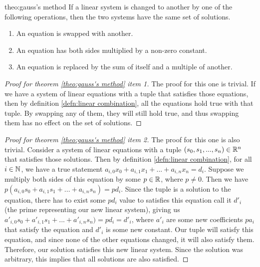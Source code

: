 \begin{theo}{theo:gauss's method}
	If a linear system is changed to another by one of the following operations, then the two systems have the same set of solutions.
	\begin{enumerate}
		\item An equation is swapped with another.
		\item An equation has both sides multiplied by a non-zero constant.
		\item An equation is replaced by the sum of itself and a multiple of another.
	\end{enumerate}
\end{theo}
\begin{proof}[Proof for theorem \ref{theo:gauss's method} item 1]
	The proof for this one is trivial. If we have a system of linear equations with a tuple that satisfies those equations, then by definition \ref{defn:linear combination}, all the equations hold true with that tuple. By swapping any of them, they will still hold true, and thus swapping them has no effect on the set of solutions.
\end{proof}
\begin{proof}[Proof for theorem \ref{theo:gauss's method} item 2]
	The proof for this one is also trivial. Consider a system of linear equations with a tuple $(s_0, s_1,..., s_n) \in{\mathbb R}^n$ that satisfies those solutions. Then by definition \ref{defn:linear combination}, for all $i\in{\mathbb N}$, we have a true statement $a_{i,0}x_0 + a_{i,1}x_1 + ... + a_{i,n}x_n = d_i$. Suppose we multiply both sides of this equation by some $p\in{\mathbb R}$, where $p \neq 0$. Then we have $p(a_{i,0}s_0 + a_{i,1}s_1 + ... + a_{i,n}s_n)= pd_i$. Since the tuple is a solution to the equation, there has to exist some $pd_i$ value to satisfies this equation call it $d'_i$ (the prime representing our new linear system), giving us $a'_{i,0}s_0 + a'_{i,1}s_1 + ... + a'_{i,n}s_n) = pd_i = d'_i$, where $a'_i$ are some new coefficients $pa_i$ that satisfy the equation and $d'_i$ is some new constant. Our tuple will satisfy this equation, and since none of the other equations changed, it will also satisfy them. Therefore, our solution satisfies this new linear system. Since the solution was arbitrary, this implies that all solutions are also satisfied.
\end{proof}
